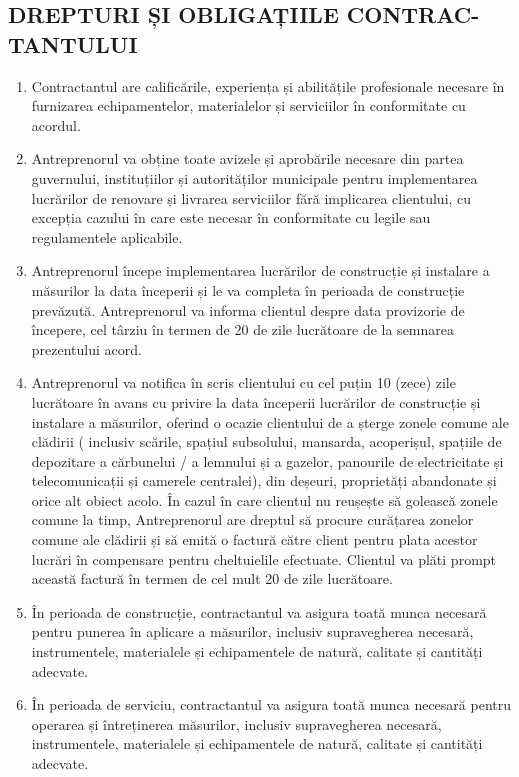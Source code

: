\begin{multicols}{2}
\subsection{DREPTURI ȘI OBLIGAȚIILE CONTRAC-TANTULUI}
\begin{enumerate}
\item Contractantul are calificările, experiența și abilitățile profesionale necesare în furnizarea echipamentelor, materialelor și serviciilor în conformitate cu acordul.
\item Antreprenorul va obține toate avizele și aprobările necesare din partea guvernului, instituțiilor și autorităților municipale pentru implementarea lucrărilor de renovare și livrarea serviciilor fără implicarea clientului, cu excepția cazului în care este necesar în conformitate cu legile sau regulamentele aplicabile.
\item Antreprenorul începe implementarea lucrărilor de construcție și instalare a măsurilor la data începerii și le va completa în perioada de construcție prevăzută. Antreprenorul va informa clientul despre data provizorie de începere, cel târziu în termen de 20 de zile lucrătoare de la semnarea prezentului acord.
\item Antreprenorul va notifica în scris clientului cu cel puțin 10 (zece) zile lucrătoare în avans cu privire la data începerii lucrărilor de construcție și instalare a măsurilor, oferind o ocazie clientului de a șterge zonele comune ale clădirii ( inclusiv scările, spațiul subsolului, mansarda, acoperișul, spațiile de depozitare a cărbunelui / a lemnului și a gazelor, panourile de electricitate și telecomunicații și camerele centralei), din deșeuri, proprietăți abandonate și orice alt obiect acolo. În cazul în care clientul nu reușește să golească zonele comune la timp, Antreprenorul are dreptul să procure curățarea zonelor comune ale clădirii și să emită o factură către client pentru plata acestor lucrări în compensare pentru cheltuielile efectuate. Clientul va plăti prompt această factură în termen de cel mult 20 de zile lucrătoare.
\item În perioada de construcție, contractantul va asigura toată munca necesară pentru punerea în aplicare a măsurilor, inclusiv supravegherea necesară, instrumentele, materialele și echipamentele de natură, calitate și cantități adecvate.
\item În perioada de serviciu, contractantul va asigura toată munca necesară pentru operarea și întreținerea măsurilor, inclusiv supravegherea necesară, instrumentele, materialele și echipamentele de natură, calitate și cantități adecvate.

\end{enumerate}
\end{multicols}
